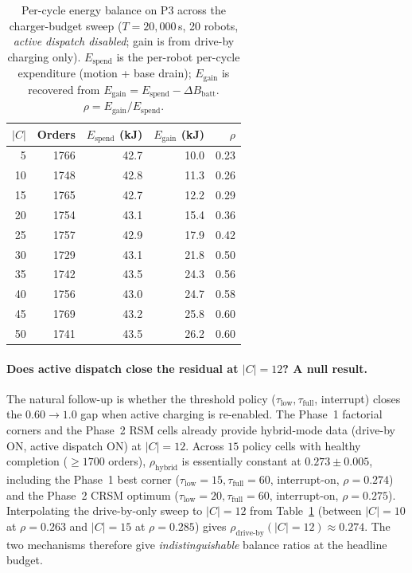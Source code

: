 \documentclass[conference]{IEEEtran}
\begin{document}
\begin{table}[t]
\centering
\caption{Per-cycle energy balance on P3 across the charger-budget sweep ($T = 20{,}000$\,s, 20 robots, \emph{active dispatch disabled}; gain is from drive-by charging only). $E_\text{spend}$ is the per-robot per-cycle expenditure (motion + base drain); $E_\text{gain}$ is recovered from $E_\text{gain} = E_\text{spend} - \Delta B_\text{batt}$. $\rho = E_\text{gain}/E_\text{spend}$.}
\label{tab:p3_balance}
\small
\begin{tabular}{rrrrr}
\toprule
$|C|$ & Orders & $E_\text{spend}$ (kJ) & $E_\text{gain}$ (kJ) & $\rho$ \\
\midrule
 5 & 1766 & 42.7 & 10.0 & 0.23 \\
10 & 1748 & 42.8 & 11.3 & 0.26 \\
15 & 1765 & 42.7 & 12.2 & 0.29 \\
20 & 1754 & 43.1 & 15.4 & 0.36 \\
25 & 1757 & 42.9 & 17.9 & 0.42 \\
30 & 1729 & 43.1 & 21.8 & 0.50 \\
35 & 1742 & 43.5 & 24.3 & 0.56 \\
40 & 1756 & 43.0 & 24.7 & 0.58 \\
45 & 1769 & 43.2 & 25.8 & 0.60 \\
50 & 1741 & 43.5 & 26.2 & 0.60 \\
\bottomrule
\end{tabular}
\end{table}

\paragraph{Does active dispatch close the residual at $|C|=12$? A null result.}
The natural follow-up is whether the threshold policy ($\tau_\text{low}, \tau_\text{full}$, interrupt) closes the $0.60 \rightarrow 1.0$ gap when active charging is re-enabled. The Phase~1 factorial corners and the Phase~2 RSM cells already provide hybrid-mode data (drive-by ON, active dispatch ON) at $|C| = 12$. Across $15$ policy cells with healthy completion ($\geq 1700$ orders), $\rho_\text{hybrid}$ is essentially constant at $0.273 \pm 0.005$, including the Phase~1 best corner ($\tau_\text{low}=15,\tau_\text{full}=60$, interrupt-on, $\rho = 0.274$) and the Phase~2 CRSM optimum ($\tau_\text{low}=20,\tau_\text{full}=60$, interrupt-on, $\rho = 0.275$). Interpolating the drive-by-only sweep to $|C| = 12$ from Table~\ref{tab:p3_balance} (between $|C| = 10$ at $\rho = 0.263$ and $|C| = 15$ at $\rho = 0.285$) gives $\rho_\text{drive-by}(|C|=12) \approx 0.274$. The two mechanisms therefore give \emph{indistinguishable} balance ratios at the headline budget.
\end{document}
